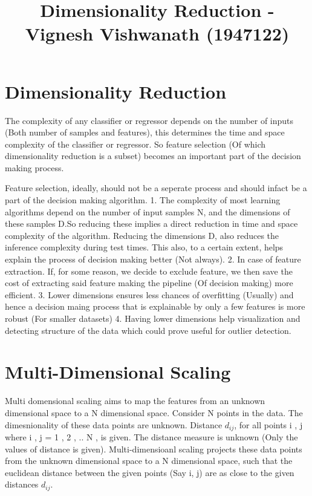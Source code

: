 \documentclass[11pt]{article}
\title{Dimensionality Reduction - Vignesh Vishwanath (1947122)}
\begin{document}
    
    \maketitle
    
    

    
    \hypertarget{dimensionality-reduction}{%
\section{Dimensionality Reduction}\label{dimensionality-reduction}}

    The complexity of any classifier or regressor depends on the number of
inputs (Both number of samples and features), this determines the time
and space complexity of the classifier or regressor. So feature
selection (Of which dimensionality reduction is a subset) becomes an
important part of the decision making process.

    Feature selection, ideally, should not be a seperate process and should
infact be a part of the decision making algorithm. 1. The complexity of
most learning algorithms depend on the number of input samples N, and
the dimensions of these samples D.So reducing these implies a direct
reduction in time and space complexity of the algorithm. Reducing the
dimensions D, also reduces the inference complexity during test times.
This also, to a certain extent, helps explain the process of decision
making better (Not always). 2. In case of feature extraction. If, for
some reason, we decide to exclude feature, we then save the cost of
extracting said feature making the pipeline (Of decision making) more
efficient. 3. Lower dimensions ensures less chances of overfitting
(Usually) and hence a decision maing process that is explainable by only
a few features is more robust (For smaller datasets) 4. Having lower
dimensions help visualization and detecting structure of the data which
could prove useful for outlier detection.

    \hypertarget{multi-dimensional-scaling}{%
\section{Multi-Dimensional Scaling}\label{multi-dimensional-scaling}}

    Multi domensional scaling aims to map the features from an unknown
dimensional space to a N dimensional space. Consider N points in the
data. The dimesnionality of these data points are unknown. Distance
\(d_{ij}\), for all points i , j where i , j = 1 , 2 , .. N , is given.
The distance measure is unknown (Only the values of distance is given).
Multi-dimensioanl scaling projects these data points from the unknown
dimensional space to a N dimensional space, such that the euclidean
distance between the given points (Say i, j) are as close to the given
distances \(d_{ij}\).
\end{document}
